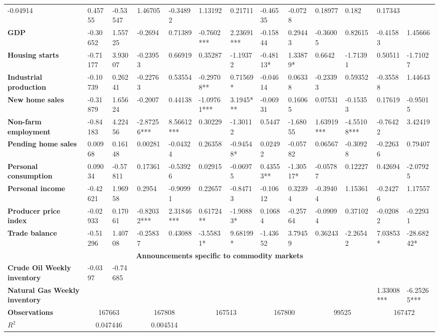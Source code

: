 \begin{sidewaystable}
{\begin{tabular}{@{}lllllllllllll@{}}
-0.04914 & 0.45755 & -0.53547 & 1.46705 & -0.34892 & 1.13192 & 0.21711 & -0.46535 & -0.0728 & 0.18977 & 0.182 & 0.17343 \\ \textbf{GDP}& -0.30652 & 1.55725 & -0.2694 & 0.71389 & -0.7602*** & 2.23691*** & -0.15844 & 0.29443 & -0.36005 & 0.82615 & -0.41583 & 1.45666 \\ \textbf{Housing starts}& -0.71177 & 3.93007 & -0.23953 & 0.66919 & 0.35287 & -1.19372 & -0.48113* & 1.33879* & 0.6642 & -1.71391 & 0.50511 & -1.71027 \\ \textbf{Industrial production}& -0.10739 & 0.26241 & -0.22763 & 0.53554 & -0.29708** & 0.71569* & -0.04614 & 0.06338 & -0.23393 & 0.59352 & -0.35588 & 1.44643 \\ \textbf{New home sales}& -0.31879 & 1.65624 & -0.2007 & 0.44138 & -1.09761*** & 3.1945*** & -0.06931 & 0.16065 & 0.07531 & -0.15353 & 0.17619 & -0.95015 \\ \textbf{Non-farm employment}& -0.84183 & 4.22456 & -2.87256***& 8.56612***& 0.30229 & -1.30112 & 0.5447 & -1.68055 & 1.63919*** & -4.55108*** & -0.76422 & 3.42419 \\ \textbf{Pending home sales}& 0.00968 & 0.16148 & 0.00281 & -0.04324 & 0.26358 & -0.94548* & 0.02492 & -0.05782 & 0.06567 & -0.30928 & -0.22636 & 0.79407 \\ \textbf{Personal consumption}& 0.09034 & -0.57811 & 0.17361 & -0.53926 & 0.02915 & -0.06975 & 0.43553** & -1.30517* & -0.05787 & 0.12227 & 0.42694 & -2.07925 \\ \textbf{Personal income}& -0.42621 & 1.96958 & 0.2954 & -0.90991 & 0.22657 & -0.84713 & -0.10612 & 0.32394 & -0.39404 & 1.15361 & -0.24276 & 1.17557 \\ \textbf{Producer price index}& -0.02933 & 0.17061 & -0.82032***& 2.31846***& 0.61724** & -1.90883* & 0.10684 & -0.25764 & -0.09094 & 0.37102 & -0.02082 & -0.22931 \\ \textbf{Trade balance}& -0.51296 & 1.40708 & -0.25837 & 0.43088 & -3.55831* & 9.68199* & -1.43652 & 3.79459 & 0.36243 & -2.26542 & 7.03853* & -28.68242* \\  \midrule \multicolumn{13}{c}{\textbf{Announcements specific to commodity markets}} \\ \midrule \textbf{Crude Oil Weekly inventory}& -0.0397 & -0.74685 &  &  &  &  &  &  &  &  &  &  \\ \textbf{Natural Gas Weekly inventory}&  &  &  &  &  &  &  &  &  &  & 1.33008*** & -6.25265*** \\  \midrule \textbf{Observations}             &\multicolumn{2}{c}{ 167663 }                                                 & \multicolumn{2}{c}{ 167808 }                                                 & \multicolumn{2}{c}{ 167513 }                                                 & \multicolumn{2}{c}{ 167800 }                                                 & \multicolumn{2}{c}{ 99525 }                                                   & \multicolumn{2}{c}{ 167472 }                                                 \\ \textbf{$R^2$}             &\multicolumn{2}{c}{ 0.047446 }                                                 & \multicolumn{2}{c}{ 0.004514 }                    
\end{tabular}}
\end{sidewaystable}
